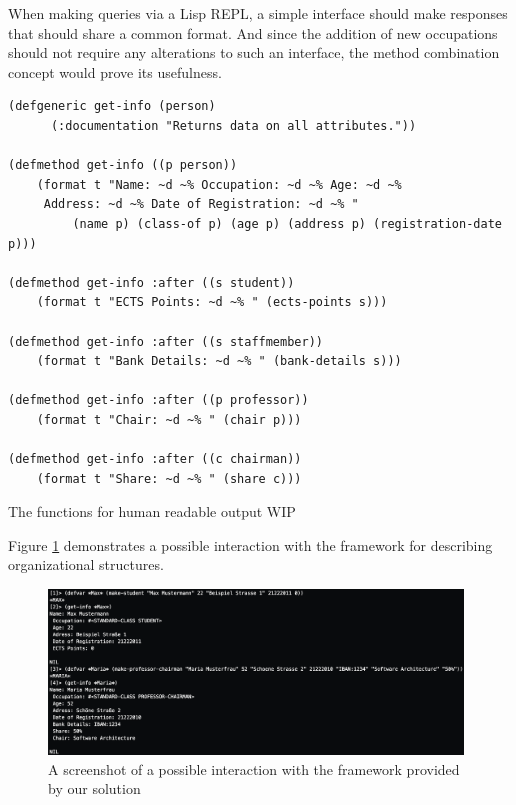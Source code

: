 \documentclass[oribibl]{llncs}
\begin{document}
When making queries via a Lisp REPL, a simple interface should make responses that should share a common format. And since the addition of new occupations should not require any alterations to such an interface, the method combination concept would prove its usefulness. 


\begin{listing}[]%
 \centering
\begin{verbatim}
(defgeneric get-info (person)
      (:documentation "Returns data on all attributes."))

(defmethod get-info ((p person))
    (format t "Name: ~d ~% Occupation: ~d ~% Age: ~d ~% 
     Address: ~d ~% Date of Registration: ~d ~% "
         (name p) (class-of p) (age p) (address p) (registration-date p)))

(defmethod get-info :after ((s student))
    (format t "ECTS Points: ~d ~% " (ects-points s)))

(defmethod get-info :after ((s staffmember))
    (format t "Bank Details: ~d ~% " (bank-details s)))

(defmethod get-info :after ((p professor))
    (format t "Chair: ~d ~% " (chair p)))

(defmethod get-info :after ((c chairman))
    (format t "Share: ~d ~% " (share c)))

\end{verbatim}
\caption{The functions for human readable output WIP}
\label{lst:interface}
\end{listing}

Figure \ref{fig:repl} demonstrates a possible interaction with the framework for describing organizational structures.

\begin{figure}[]
    \centering
    \includegraphics[width=0.98\textwidth]{images/repl.png}
    \caption{A screenshot of a possible interaction with the framework provided by our solution}
    \label{fig:repl}
\end{figure}
\end{document}
